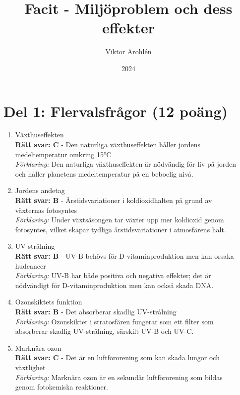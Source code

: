 \documentclass[a4paper]{article}
\title{Facit - Miljöproblem och dess effekter}
\author{Viktor Arohlén}
\date{2024}
\begin{document}
\maketitle

\section*{Del 1: Flervalsfrågor (12 poäng)}

\begin{enumerate}
\item Växthuseffekten\\
\textbf{Rätt svar: C} - Den naturliga växthuseffekten håller jordens\\
medeltemperatur omkring 15°C\\
\textit{Förklaring:} Den naturliga växthuseffekten är nödvändig för liv på jorden\\
och håller planetens medeltemperatur på en beboelig nivå.

\item Jordens andetag\\
\textbf{Rätt svar: B} - Årstidsvariationer i koldioxidhalten på grund av\\
växternas fotosyntes\\
\textit{Förklaring:} Under växtsäsongen tar växter upp mer koldioxid genom\\
fotosyntes, vilket skapar tydliga årstidsvariationer i atmosfärens halt.

\item UV-strålning\\
\textbf{Rätt svar: B} - UV-B behövs för D-vitaminproduktion men kan orsaka\\
hudcancer\\
\textit{Förklaring:} UV-B har både positiva och negativa effekter; det är\\
nödvändigt för D-vitaminproduktion men kan också skada DNA.

\item Ozonskiktets funktion\\
\textbf{Rätt svar: B} - Det absorberar skadlig UV-strålning\\
\textit{Förklaring:} Ozonskiktet i stratosfären fungerar som ett filter som\\
absorberar skadlig UV-strålning, särskilt UV-B och UV-C.

\item Marknära ozon\\
\textbf{Rätt svar: C} - Det är en luftförorening som kan skada lungor och\\
växtlighet\\
\textit{Förklaring:} Marknära ozon är en sekundär luftförorening som bildas\\
genom fotokemiska reaktioner.


\end{enumerate}
\end{document}
